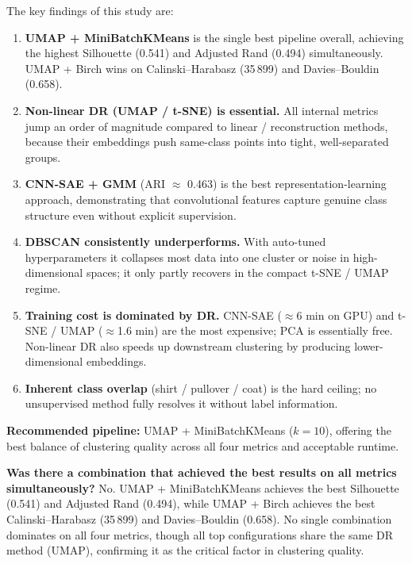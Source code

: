 The key findings of this study are:

\begin{enumerate}
  \item \textbf{UMAP + MiniBatchKMeans} is the single best pipeline overall, achieving the
    highest Silhouette (0.541) and Adjusted Rand (0.494) simultaneously.
    UMAP + Birch wins on Calinski--Harabasz (35\,899) and Davies--Bouldin (0.658).
  \item \textbf{Non-linear DR (UMAP / t-SNE) is essential.} All internal metrics jump an
    order of magnitude compared to linear / reconstruction methods, because their embeddings
    push same-class points into tight, well-separated groups.
  \item \textbf{CNN-SAE + GMM} (ARI $\approx$ 0.463) is the best representation-learning
    approach, demonstrating that convolutional features capture genuine class structure even
    without explicit supervision.
  \item \textbf{DBSCAN consistently underperforms.} With auto-tuned hyperparameters it
    collapses most data into one cluster or noise in high-dimensional spaces; it only partly
    recovers in the compact t-SNE / UMAP regime.
  \item \textbf{Training cost is dominated by DR.} CNN-SAE ($\approx$6 min on GPU) and
    t-SNE / UMAP ($\approx$1.6 min) are the most expensive; PCA is essentially free.
    Non-linear DR also speeds up downstream clustering by producing lower-dimensional embeddings.
  \item \textbf{Inherent class overlap} (shirt / pullover / coat) is the hard ceiling; no
    unsupervised method fully resolves it without label information.
\end{enumerate}

\medskip
\noindent\textbf{Recommended pipeline:} UMAP + MiniBatchKMeans ($k=10$), offering the best
balance of clustering quality across all four metrics and acceptable runtime.

\medskip
\noindent\textbf{Was there a combination that achieved the best results on all metrics simultaneously?}
No. UMAP + MiniBatchKMeans achieves the best Silhouette (0.541) and Adjusted Rand (0.494),
while UMAP + Birch achieves the best Calinski--Harabasz (35\,899) and Davies--Bouldin (0.658).
No single combination dominates on all four metrics, though all top configurations share the
same DR method (UMAP), confirming it as the critical factor in clustering quality.
